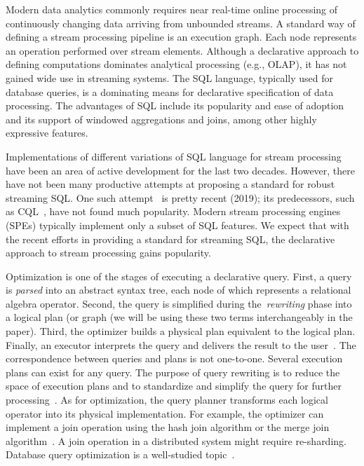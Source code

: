 \label {fs-optimization-introduction}

Modern data analytics commonly requires near real-time online processing of continuously changing data arriving from unbounded streams. 
A standard way of defining a stream processing pipeline is an execution graph. Each node represents an operation performed over stream elements. 
Although a declarative approach to defining computations dominates analytical processing (e.g., OLAP),  it has not gained wide use in streaming systems. 
The SQL language, typically used for database queries, is a dominating means for declarative specification of data processing. 
The advantages of SQL include its popularity and ease of adoption and its support of windowed aggregations and joins, among other highly expressive features. 

Implementations of different variations of SQL language for stream processing have been an area of active development for the last two decades. 
However, there have not been many productive attempts at proposing a standard for robust streaming SQL. 
One such attempt~\cite{Begoli:2019:OSR:3299869.3314040} is pretty recent (2019); its predecessors, such as CQL~\cite{Arasu:2006:CCQ:1146461.1146463}, have not found much popularity.
 Modern stream processing engines (SPEs) typically implement only a subset of SQL features. 
 We expect that with the recent efforts in providing a standard for streaming SQL, the declarative approach to stream processing gains popularity. 

Optimization is one of the stages of executing a declarative query. 
First, a query is \textit{parsed} into an abstract syntax tree, each node of which represents a relational algebra operator. 
Second, the query is simplified during the~\textit{rewriting} phase into a logical plan (or graph (we will be using these two terms interchangeably in the paper).
 Third, the optimizer builds a physical plan equivalent to the logical plan. Finally, an executor interprets the query and delivers the result to the user~\cite{Pitoura2018processing}. 
The correspondence between queries and plans is not one-to-one. Several execution plans can exist for any query.
The purpose of query rewriting is to reduce the space of execution plans and to standardize and simplify the query for further processing~\cite{Pitoura2018rewriting}.
 As for optimization, the query planner transforms each logical operator into its physical implementation. For example, the optimizer can implement a join operation using the hash join algorithm or the merge join algorithm~\cite{Neumann2018optimization}. A join operation in a distributed system might require re-sharding.  
Database query optimization is a well-studied topic~\cite{astrahan1976system, haas1989extensible, graefe1993volcano}. 

